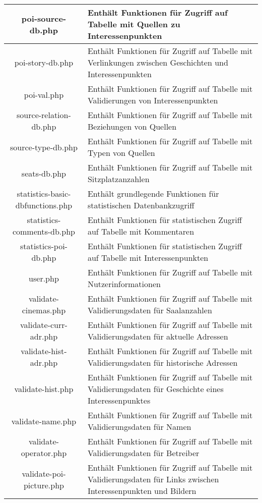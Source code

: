 \begin{longtable}[H]{|c|p{10cm}|}
	poi-source-db.php & Enthält Funktionen für Zugriff auf Tabelle mit Quellen zu Interessenpunkten \\ \hline
	poi-story-db.php & Enthält Funktionen für Zugriff auf Tabelle mit Verlinkungen zwischen Geschichten und Interessenpunkten \\ \hline
	poi-val.php & Enthält Funktionen für Zugriff auf Tabelle mit Validierungen von Interessenpunkten \\ \hline
	source-relation-db.php & Enthält Funktionen für Zugriff auf Tabelle mit Beziehungen von Quellen \\ \hline
	source-type-db.php & Enthält Funktionen für Zugriff auf Tabelle mit Typen von Quellen \\ \hline
	seats-db.php & Enthält Funktionen für Zugriff auf Tabelle mit Sitzplatzanzahlen \\ \hline
	statistics-basic-dbfunctions.php & Enthält grundlegende Funktionen für statistischen Datenbankzugriff \\ \hline
	statistics-comments-db.php & Enthält Funktionen für statistischen Zugriff auf Tabelle mit Kommentaren \\ \hline
	statistics-poi-db.php & Enthält Funktionen für statistischen Zugriff auf Tabelle mit Interessenpunkten \\ \hline
	user.php & Enthält Funktionen für Zugriff auf Tabelle mit Nutzerinformationen \\ \hline
	validate-cinemas.php & Enthält Funktionen für Zugriff auf Tabelle mit Validierungsdaten für Saalanzahlen \\ \hline
	validate-curr-adr.php & Enthält Funktionen für Zugriff auf Tabelle mit Validierungsdaten für aktuelle Adressen \\ \hline
	validate-hist-adr.php & Enthält Funktionen für Zugriff auf Tabelle mit Validierungsdaten für historische Adressen\\ \hline
	validate-hist.php & Enthält Funktionen für Zugriff auf Tabelle mit Validierungsdaten für Geschichte eines Interessenpunktes \\ \hline
	validate-name.php & Enthält Funktionen für Zugriff auf Tabelle mit Validierungsdaten für Namen \\ \hline
	validate-operator.php & Enthält Funktionen für Zugriff auf Tabelle mit Validierungsdaten für Betreiber \\ \hline
	validate-poi-picture.php & Enthält Funktionen für Zugriff auf Tabelle mit Validierungsdaten für Links zwischen Interessenpunkten und Bildern \\ \hline

\end{longtable}
